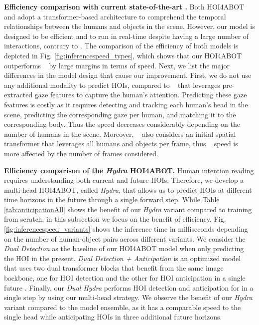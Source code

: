 \documentclass{article}
\begin{document}
\textbf{Efficiency comparison with current state-of-the-art \cite{NI2023103741}.} Both HOI4ABOT and \cite{NI2023103741} adopt a transformer-based architecture to comprehend the temporal relationships between the humans and objects in the scene. However, our model is designed to be efficient and to run in real-time despite having a large number of interactions, contrary to \cite{NI2023103741}. The comparison of the efficiency of both models is depicted in Fig. \ref{fig:inferencespeed_types}, which shows that our HOI4ABOT outperforms ~\citep{NI2023103741} by large margins in terms of speed. Next, we list the major differences in the model design that cause our improvement. First, we do not use any additional modality to predict HOIs, compared to ~\citep{NI2023103741} that leverages pre-extracted gaze features to capture the human's attention. Predicting these gaze features is costly as it requires detecting and tracking each human's head in the scene, predicting the corresponding gaze per human, and matching it to the corresponding body. Thus the speed decreases considerably depending on the number of humans in the scene. Moreover, ~\citep{NI2023103741} also considers an initial spatial transformer that leverages all humans and objects per frame, thus ~\citep{NI2023103741} speed is more affected by the number of frames considered.

\textbf{Efficiency comparison of the \textit{Hydra} HOI4ABOT.} Human intention reading requires understanding both current and future HOIs. Therefore, we develop a multi-head HOI4ABOT, called \textit{Hydra}, that allows us to predict HOIs at different time horizons in the future through a single forward step. While Table \ref{tab:anticipationAll} shows the benefit of our \textit{Hydra} variant compared to training from scratch, in this subsection we focus on the benefit of efficiency. Fig. \ref{fig:inferencespeed_variants} shows the inference time in milliseconds depending on the number of human-object pairs across different variants. We consider the \textit{Dual Detection} as the baseline of our HOI4ABOT model when only predicting the HOI in the present. \textit{Dual Detection + Anticipation} is an optimized model that uses two dual transformer blocks that benefit from the same image backbone, one for HOI detection and the other for HOI anticipation in a single future . Finally, our \textit{Dual Hydra} performs HOI detection and anticipation for  in a single step by using our multi-head strategy. We observe the benefit of our \textit{Hydra} variant compared to the model ensemble, as it has a comparable speed to the single head while anticipating HOIs in three additional future horizons.
\end{document}
